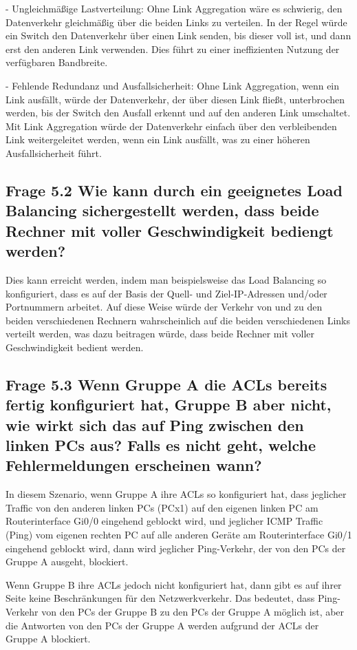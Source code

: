 \documentclass{article}
\begin{document}
- Ungleichmäßige Lastverteilung: Ohne Link Aggregation wäre es schwierig, den Datenverkehr gleichmäßig über die beiden Links zu verteilen. In der Regel würde ein Switch den Datenverkehr über einen Link senden, bis dieser voll ist, und dann erst den anderen Link verwenden. Dies führt zu einer ineffizienten Nutzung der verfügbaren Bandbreite.

- Fehlende Redundanz und Ausfallsicherheit: Ohne Link Aggregation, wenn ein Link ausfällt, würde der Datenverkehr, der über diesen Link fließt, unterbrochen werden, bis der Switch den Ausfall erkennt und auf den anderen Link umschaltet. Mit Link Aggregation würde der Datenverkehr einfach über den verbleibenden Link weitergeleitet werden, wenn ein Link ausfällt, was zu einer höheren Ausfallsicherheit führt.\\

\subsection*{Frage 5.2 \normalfont Wie kann durch ein geeignetes Load Balancing sichergestellt werden, dass beide Rechner mit voller Geschwindigkeit bediengt werden?}
Dies kann erreicht werden, indem man beispielsweise das Load Balancing so konfiguriert, dass es auf der Basis der Quell- und Ziel-IP-Adressen und/oder Portnummern arbeitet. Auf diese Weise würde der Verkehr von und zu den beiden verschiedenen Rechnern wahrscheinlich auf die beiden verschiedenen Links verteilt werden, was dazu beitragen würde, dass beide Rechner mit voller Geschwindigkeit bedient werden.\\

\subsection*{Frage 5.3 \normalfont Wenn Gruppe A die ACLs bereits fertig konfiguriert hat, Gruppe B aber nicht, wie wirkt sich das auf Ping zwischen den linken PCs aus? Falls es nicht geht, welche Fehlermeldungen erscheinen wann?}
In diesem Szenario, wenn Gruppe A ihre ACLs so konfiguriert hat, dass jeglicher Traffic von den anderen linken PCs (PCx1) auf den eigenen linken PC am Routerinterface Gi0/0 eingehend geblockt wird, und jeglicher ICMP Traffic (Ping) vom eigenen rechten PC auf alle anderen Geräte am Routerinterface Gi0/1 eingehend geblockt wird, dann wird jeglicher Ping-Verkehr, der von den PCs der Gruppe A ausgeht, blockiert.

Wenn Gruppe B ihre ACLs jedoch nicht konfiguriert hat, dann gibt es auf ihrer Seite keine Beschränkungen für den Netzwerkverkehr. Das bedeutet, dass Ping-Verkehr von den PCs der Gruppe B zu den PCs der Gruppe A möglich ist, aber die Antworten von den PCs der Gruppe A werden aufgrund der ACLs der Gruppe A blockiert.
\end{document}
